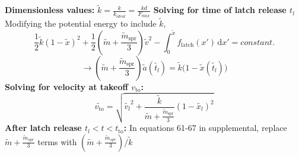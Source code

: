 \documentclass[12pt]{article}
\begin{document}
\noindent \textbf{Dimensionless values:} 
\newline
$\tilde{k} = \frac{k}{k_{ideal}} = \frac{kd}{F_{max}}$
\newline
\newline
\noindent \textbf{Solving for time of latch release $t_l$}
\newline
Modifying the potential energy to include $\tilde{k}$,
\[
    \frac{1}{2}\tilde{k}(1-\tilde{x})^2 + \frac{1}{2}\left(\tilde{m} + \frac{\tilde{m}_{\text{spr}}}{3} \right)\tilde{v}^2 - \int_0^{\tilde{x}} \! f_{\text{latch}}(x') \, \mathrm{d}x' = constant. 
\]
\[
    \rightarrow \left(\tilde{m} + \frac{\tilde{m}_{\text{spr}}}{3} \right)\tilde{a}(\tilde{t_l}) = \tilde{k} \biggl( 1 - \tilde{x}(\tilde{t_l}) \biggr)
\]
\newline 
\newline
\noindent \textbf{Solving for velocity at takeoff $v_{\text{to}}$:}
\newline
\[
    \tilde{v_{\text{to}}} = \sqrt{\tilde{v_l}^2 + \frac{\tilde{k}}{\tilde{m} + \frac{\tilde{m}_{\text{spr}}}{3}} (1 - \tilde{x_l})^2}
\]
\newline 
\newline
\noindent \textbf{After latch release $t_l < t < t_{\text{to}}$:}
\newline
In equations 61-67 in supplemental, replace $\tilde{m} + \frac{\tilde{m}_{spr}}{3}$ terms with $(\tilde{m} + \frac{\tilde{m}_{spr}}{3}) / \tilde{k}$
\newline
\end{document}
